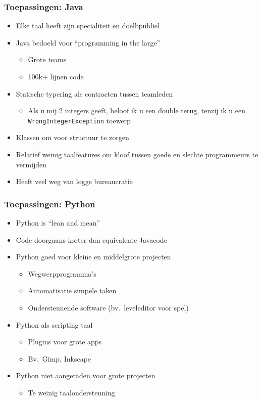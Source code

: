 \begin{frame}
  \frametitle{Toepassingen: Java}
  \begin{itemize}
    \item Elke taal heeft zijn specialiteit en doelbpubliel
    \item Java bedoeld voor ``programming in the large''
          \begin{itemize}
            \item Grote teams
            \item 100k+ lijnen code
          \end{itemize}
    \item Statische typering als contracten tussen teamleden
          \begin{itemize}
            \item Als u mij 2 integers geeft, beloof ik u een double terug, tenzij ik u een
                  \texttt{WrongIntegerException} toewerp
          \end{itemize}
    \item Klassen om voor structuur te zorgen
    \item Relatief weinig taalfeatures om kloof tussen goede en slechte programmeurs te vermijden
    \item Heeft veel weg van logge bureaucratie
  \end{itemize}
\end{frame}

\begin{frame}
  \frametitle{Toepassingen: Python}
  \begin{itemize}
    \item Python is ``lean and mean''
    \item Code doorgaans korter dan equivalente Javacode
    \item Python goed voor kleine en middelgrote projecten
          \begin{itemize}
            \item Wegwerpprogramma's
            \item Automatisatie simpele taken
            \item Ondersteunende software (bv.~leveleditor voor spel)
          \end{itemize}
    \item Python als scripting taal
          \begin{itemize}
            \item Plugins voor grote apps
            \item Bv.~Gimp, Inkscape
          \end{itemize}
    \item Python niet aangeraden voor grote projecten
          \begin{itemize}
            \item Te weinig taalondersteuning
          \end{itemize}
  \end{itemize}
\end{frame}




